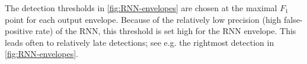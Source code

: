 The detection thresholds in \cref{fig:RNN-envelopes} are chosen at the maximal $F_1$ point for each output envelope. Because of the relatively low precision (high false-positive rate) of the RNN, this threshold is set high for the RNN envelope. This leads often to relatively late detections; see e.g. the rightmost detection in \cref{fig:RNN-envelopes}.



